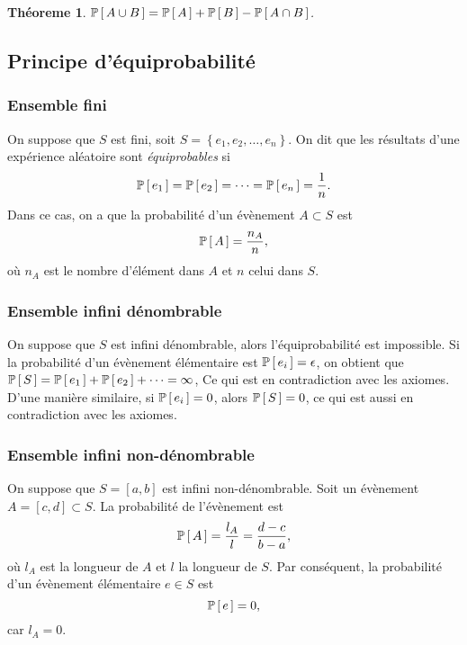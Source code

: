 \documentclass[11pt]{article}
\renewcommand\P[1]{%
	\ensuremath{%
		\mathbb{P}\left[\,#1\,\right]%
	}%
}%
\newtheorem{theoreme}{Théoreme}[section]
\theoremstyle{remark}
\theoremstyle{definition}
\begin{document}
\begin{theoreme}
	$\P{A\cup B}=\P{A}+\P{B}-\P{A\cap B}$.
\end{theoreme}

\subsection{Principe d'équiprobabilité}
\subsubsection{Ensemble fini}
On suppose que $S$ est fini, soit $S=\left\{e_1,e_2,\dots,e_n\right\}$. On dit
que les résultats d'une expérience aléatoire sont \textit{équiprobables} si
\begin{equation*}
	\P{e_1}=\P{e_2}=\cdots=\P{e_n}=\frac{1}{n}.
\end{equation*}
Dans ce cas, on a que la probabilité d'un évènement $A\subset S$ est
\begin{equation*}
	\P{A}=\frac{n_A}{n},
\end{equation*}
où $n_A$ est le nombre d'élément dans $A$ et $n$ celui dans $S$.

\subsubsection{Ensemble infini dénombrable}
On suppose que $S$ est infini dénombrable, alors l'équiprobabilité est
impossible. Si la probabilité d'un évènement élémentaire est $\P{e_i}=\epsilon$,
on obtient que $\P{S}=\P{e_1}+\P{e_2}+\cdots=\infty$, Ce qui est en contradiction
avec les axiomes. D'une manière similaire, si $\P{e_i}=0$, alors $\P{S}=0$, ce
qui est aussi en contradiction avec les axiomes.

\subsubsection{Ensemble infini non-dénombrable}
On suppose que $S=[a,b]$ est infini non-dénombrable. Soit un évènement
$A=[c,d]\subset S$. La probabilité de l'évènement est
\begin{equation*}
	\P{A}=\frac{l_A}{l}=\frac{d-c}{b-a},
\end{equation*}
où $l_A$ est la longueur de $A$ et $l$ la longueur de $S$. Par conséquent, la
probabilité d'un évènement élémentaire $e\in S$ est
\begin{equation*}
	\P{e}=0,
\end{equation*}
car $l_A=0$.
\end{document}

